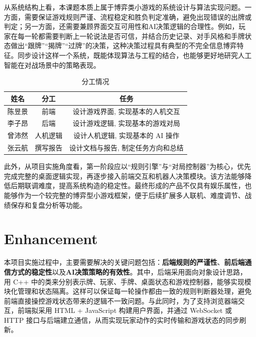 \documentclass{article}
\numberwithin{equation}{section}
\begin{document}
从系统结构上看，本课题本质上属于博弈类小游戏的系统设计与算法实现问题。一方面，需要保证游戏规则严谨、流程稳定和胜负判定准确，避免出现错误的出牌或判定；另一方面，还需要兼顾界面交互可用性和AI决策逻辑的合理性。例如，玩家在每一轮都需要判断上一轮说法是否可信，并结合历史记录、对手风格和手牌状态做出“跟牌”“揭牌”“过牌”的决策，这种决策过程具有典型的不完全信息博弈特征。同步设计这样一个系统，既能体现算法与工程的结合，也能够更好地研究人工智能在对战场景中的策略表现。

\begin{table}[H]
    \centering
    \renewcommand{\arraystretch}{1.2}
    \caption{分工情况}
    \label{tab:symbols}
    \begin{tabular}{ccc}
        \hline
        \textbf{姓名} & \textbf{分工} & \textbf{任务}\\
        \hline
        陈昱景 & 前端     & 设计游戏界面, 实现基本的人机交互\\
        李子昂 & 后端     & 设计游戏逻辑, 实现基本的游戏对局\\
        曾沛然 & 人机逻辑 & 设计人机逻辑, 实现基本的 AI 操作\\
        张云航 & 撰写报告 & 设计文档与报告, 制定任务方向和总结\\
        \hline
    \end{tabular}
\end{table}

此外，从项目实施角度看，第一阶段应以“规则引擎”与“对局控制器”为核心，优先完成完整的桌面逻辑实现，再逐步接入前端交互和机器人决策模块。该方法能够降低后期联调难度，提高系统构造的稳定性。最终形成的产品不仅具有娱乐属性，也能够作为一个较完整的博弈型小游戏框架，便于后续扩展多人联机、难度调节、战绩保存和复盘分析等功能。

\section{Enhancement}

本项目实施过程中，主要需要解决的关键问题包括：\textbf{后端规则的严谨性}、\textbf{前后端通信方式的稳定性}以及\textbf{AI决策策略的有效性}。其中，后端采用面向对象设计思路，用 C++ 中的类来分别表示牌、玩家、手牌、桌面状态和游戏控制器，能够实现模块化管理和状态隔离。这样可以保证每一轮操作都由一致的规则判断器处理，避免前端直接操控游戏状态带来的逻辑不一致问题。与此同时，为了支持浏览器端交互，前端拟采用 HTML + JavaScript 构建用户界面，并通过 WebSocket 或 HTTP 接口与后端建立通信，从而实现玩家动作的实时传输和游戏状态的同步刷新。
\end{document}
